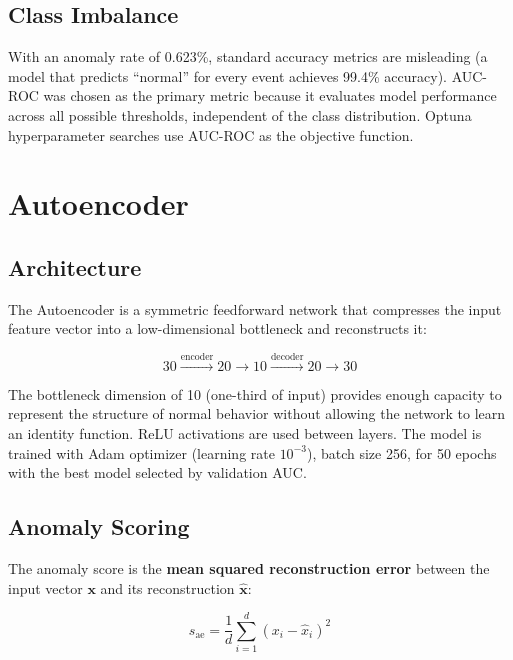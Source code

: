 \subsection{Class Imbalance}

With an anomaly rate of 0.623\%, standard accuracy metrics are misleading
(a model that predicts ``normal'' for every event achieves 99.4\% accuracy).
AUC-ROC was chosen as the primary metric because it evaluates model
performance across all possible thresholds, independent of the class
distribution. Optuna hyperparameter searches use AUC-ROC as the objective
function.

\section{Autoencoder}

\subsection{Architecture}

The Autoencoder is a symmetric feedforward network that compresses the input
feature vector into a low-dimensional bottleneck and reconstructs it:

\begin{equation}
30 \xrightarrow{\text{encoder}} 20 \xrightarrow{} 10
\xrightarrow{\text{decoder}} 20 \xrightarrow{} 30
\end{equation}

The bottleneck dimension of 10 (one-third of input) provides enough capacity
to represent the structure of normal behavior without allowing the network to
learn an identity function. ReLU activations are used between layers. The
model is trained with Adam optimizer (learning rate $10^{-3}$), batch size
256, for 50 epochs with the best model selected by validation AUC.

\subsection{Anomaly Scoring}

The anomaly score is the \textbf{mean squared reconstruction error} between
the input vector $\mathbf{x}$ and its reconstruction $\hat{\mathbf{x}}$:

\begin{equation}
s_{\text{ae}} = \frac{1}{d} \sum_{i=1}^{d} (x_i - \hat{x}_i)^2
\end{equation}

